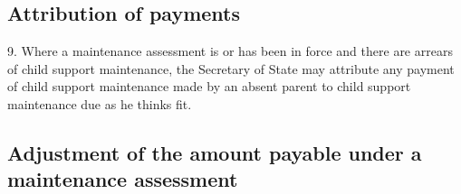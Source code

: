 \documentclass[12pt,a4paper]{article}
\begin{document}
\renewcommand\parthead{--- Part III}

\subsection[9. Attribution of payments]{Attribution of payments}

9.  Where a maintenance assessment is or has been in force and there are arrears of child support maintenance, the Secretary of State may attribute any payment of child support maintenance made by an absent parent to child support maintenance due as he thinks fit.

\subsection[10. Adjustment of the amount payable under a maintenance assessment]{Adjustment of the amount payable under a maintenance assessment}

%
%
%
%
%
%
\end{document}
